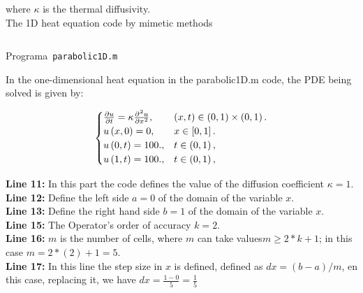 \documentclass[a4paper,abstract=true]{scrreprt}
\begin{document}
where $\kappa$ is the thermal diffusivity.\\

The 1D heat equation code by mimetic methods


\begin{listing}[ht!]
	\tiny
	\centering
	\inputminted[frame=single,framesep=12pt,linenos,firstline=1,lastline=80,highlightlines={20,29}]{octave}{../examples/octave/parabolic1D.m}
	\caption{Programa~\texttt{parabolic1D.m}}
	\label{code:parabolic1D.m}
\end{listing}


In the one-dimensional heat equation in the parabolic1D.m code, the PDE being solved is given by:


\begin{equation}\label{eq:IBVPheat1d}
	\begin{cases}
		\diffp{u}{t}=
		\kappa\diffp[2]{u}{x},
		                         & \left(x,t\right)\in
		\left(0,1 \right)\times\left(0, 1 \right).     \\
		u\left(x,0\right)= 0,
		                         & x\in
		\left[0,1\right].                              \\
		u\left(0,t\right)= 100., & t\in
		\left(0,1 \right),                             \\
		u\left(1,t\right)= 100.,
		                         & t\in
		\left(0, 1\right),
	\end{cases}
\end{equation}


\textbf{Line 11:} In this part the code defines the value of the diffusion coefficient $\kappa =1$.\\

\textbf{Line 12:} Define the left side $a= 0$ of the domain of the variable $x$.\\

\textbf{Line 13:} Define the right hand side $b= 1$ of the domain of the variable $x$.\\

\textbf{Line 15:} The Operator's order of accuracy $k = 2$.\\

\textbf{Line 16:} $m$ is the number of cells, where $m$ can take values ​​$m \geq 2*k+1$; in this case $m=2*(2)+1=5$.\\

\textbf{Line 17:} In this line the step size in $x$ is defined, defined as $dx=(b-a)/m$, en this case, replacing it, we have $dx =\frac{1-0}{5} =\frac{1}{5}$ \\
\end{document}
